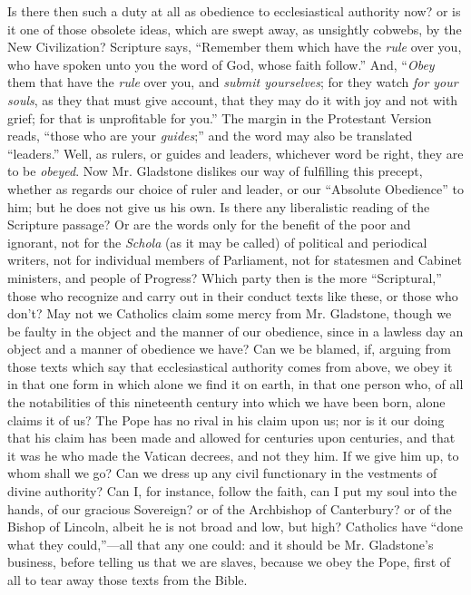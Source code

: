 Is there then such a duty at all as obedience to ecclesiastical
authority now? or is it one of those obsolete ideas, which are swept
away, as unsightly cobwebs, by the New Civilization? Scripture says,
``Remember them which have the \emph{rule} over you, who have spoken
unto you the word of God, whose faith follow.'' And, ``\emph{Obey}
them that have the \emph{rule} over you, and \emph{submit yourselves};
for they watch \emph{for your souls}, as they that must give account,
that they may do it with joy and not with grief; for that is
unprofitable for you.'' The margin in the Protestant Version reads,
``those who are your \emph{guides};'' and the word may also be
translated ``leaders.'' Well, as rulers, or guides and leaders,
whichever word be right, they are to be \emph{obeyed}. Now Mr. Gladstone
dislikes our way of fulfilling this precept, whether as regards our
choice of ruler and leader, or our ``Absolute Obedience'' to
him; but he does not give us his own. Is there any liberalistic reading
of the Scripture passage? Or are the words only for the benefit of the
poor and ignorant, not for the \emph{Schola} (as it may be called) of
political and periodical writers, not for individual members of
Parliament, not for statesmen and Cabinet ministers, and people of
Progress? Which party then is the more ``Scriptural,'' those who
recognize and carry out in their conduct texts like these, or those who
don't? May not we Catholics claim some mercy from Mr. Gladstone, though
we be faulty in the object and the manner of our obedience, since in a
lawless day an object and a manner of obedience we have? Can we be
blamed, if, arguing from those texts which say that ecclesiastical
authority comes from above, we obey it in that one form in which alone
we find it on earth, in that one person who, of all the notabilities of
this nineteenth century into which we have been born, alone claims it of
us? The Pope has no rival in his claim upon us; nor is it our doing that
his claim has been made and allowed for centuries upon centuries, and
that it was he who made the Vatican decrees, and not they him. If we
give him up, to whom shall we go? Can we dress up any civil functionary
in the vestments of divine authority? Can I, for instance, follow the
faith, can I put my soul into the hands, of our gracious Sovereign? or
of the Archbishop of Canterbury? or of the Bishop of Lincoln, albeit he
is not broad and low, but high? Catholics have ``done what they
could,''—all that any one could: and it should be Mr. Gladstone's
business, before telling us that we are slaves, because we obey the
Pope, first of all to tear away those texts from the Bible.

